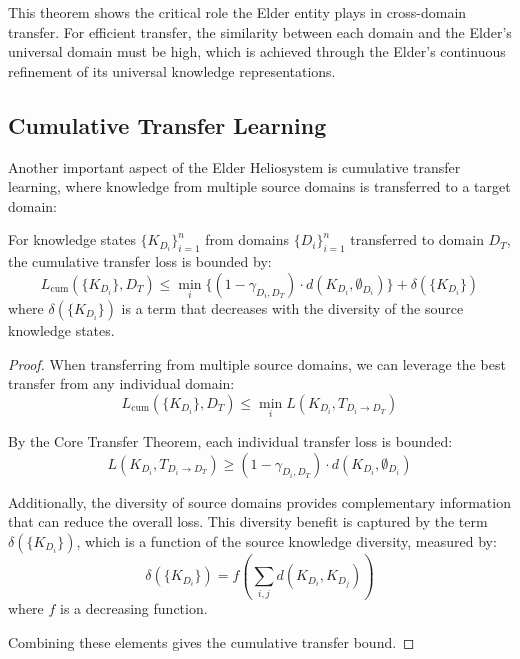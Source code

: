 This theorem shows the critical role the Elder entity plays in cross-domain transfer. For efficient transfer, the similarity between each domain and the Elder's universal domain must be high, which is achieved through the Elder's continuous refinement of its universal knowledge representations.

\subsection{Cumulative Transfer Learning}

Another important aspect of the Elder Heliosystem is cumulative transfer learning, where knowledge from multiple source domains is transferred to a target domain:

\begin{theorem}
For knowledge states $\{K_{D_i}\}_{i=1}^n$ from domains $\{D_i\}_{i=1}^n$ transferred to domain $D_T$, the cumulative transfer loss is bounded by:
\begin{equation}
L_{\text{cum}}(\{K_{D_i}\}, D_T) \leq \min_{i} \{(1 - \gamma_{D_i,D_T}) \cdot d(K_{D_i}, \emptyset_{D_i})\} + \delta(\{K_{D_i}\})
\end{equation}
where $\delta(\{K_{D_i}\})$ is a term that decreases with the diversity of the source knowledge states.
\end{theorem}

\begin{proof}
When transferring from multiple source domains, we can leverage the best transfer from any individual domain:
\begin{equation}
L_{\text{cum}}(\{K_{D_i}\}, D_T) \leq \min_{i} L(K_{D_i}, T_{D_i \to D_T})
\end{equation}

By the Core Transfer Theorem, each individual transfer loss is bounded:
\begin{equation}
L(K_{D_i}, T_{D_i \to D_T}) \geq (1 - \gamma_{D_i,D_T}) \cdot d(K_{D_i}, \emptyset_{D_i})
\end{equation}

Additionally, the diversity of source domains provides complementary information that can reduce the overall loss. This diversity benefit is captured by the term $\delta(\{K_{D_i}\})$, which is a function of the source knowledge diversity, measured by:
\begin{equation}
\delta(\{K_{D_i}\}) = f\left(\sum_{i,j} d(K_{D_i}, K_{D_j})\right)
\end{equation}
where $f$ is a decreasing function.

Combining these elements gives the cumulative transfer bound.
\end{proof}

